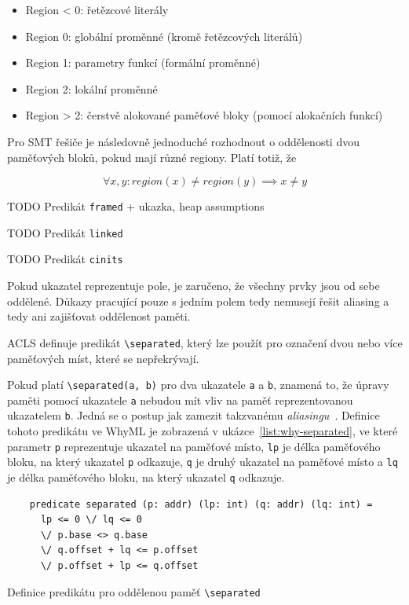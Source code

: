 \begin{itemize}
    \item Region < 0: řetězcové literály
    \item Region 0: globální proměnné (kromě řetězcových literálů)
    \item Region 1: parametry funkcí (formální proměnné)
    \item Region 2: lokální proměnné
    \item Region > 2: čerstvě alokované paměťové bloky (pomocí alokačních funkcí)
\end{itemize}

Pro SMT řešiče je následovně jednoduché rozhodnout o oddělenosti dvou paměťových bloků,
pokud mají různé regiony.
Platí totiž, že

\begin{equation*}
    \forall x, y : region(x) \neq region(y) \implies x \neq y
\end{equation*}

TODO Predikát \texttt{framed} + ukazka, heap assumptions

TODO Predikát \texttt{linked}

TODO Predikát \texttt{cinits}

Pokud ukazatel reprezentuje pole,
je zaručeno, že všechny prvky jsou od sebe oddělené.
Důkazy pracující pouze s jedním polem tedy nemusejí řešit aliasing
a tedy ani zajišťovat oddělenost paměti.

ACLS definuje predikát \texttt{\textbackslash separated},
který lze použít pro označení dvou nebo více paměťových míst,
které se nepřekrývají.


Pokud platí \texttt{\textbackslash separated(a, b)} pro dva ukazatele \texttt{a} a \texttt{b},
znamená to, že úpravy paměti pomocí ukazatele \texttt{a}
nebudou mít vliv na paměť reprezentovanou ukazatelem \texttt{b}.
Jedná se o postup jak zamezit takzvanému \textit{aliasingu}~\cite{ACSLSpec}.
Definice tohoto predikátu ve WhyML je zobrazená v ukázce~\ref{list:why-separated},
ve které parametr \texttt{p} reprezentuje ukazatel na paměťové místo,
\texttt{lp} je délka paměťového bloku, na který ukazatel \texttt{p} odkazuje,
\texttt{q} je druhý ukazatel na paměťové místo a \texttt{lq} je délka paměťového bloku,
na který ukazatel \texttt{q} odkazuje.

\begin{listing}[H]
    \begin{verbatim}
    predicate separated (p: addr) (lp: int) (q: addr) (lq: int) =
      lp <= 0 \/ lq <= 0
      \/ p.base <> q.base
      \/ q.offset + lq <= p.offset
      \/ p.offset + lp <= q.offset
    \end{verbatim}
    \caption{Definice predikátu pro oddělenou paměť \texttt{\textbackslash separated}}
    \label{list:why-separated}
\end{listing}

